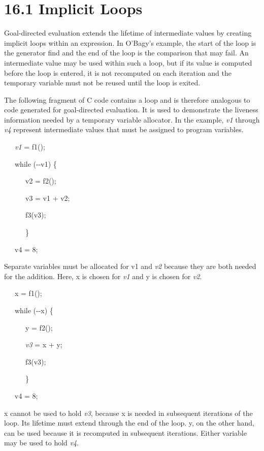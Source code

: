 \section[16.1 Implicit Loops]{16.1 Implicit Loops}

Goal-directed evaluation extends the lifetime of intermediate values
by creating implicit loops within an expression. In O'Bagy's example,
the start of the loop is the generator find and the end of the loop is
the comparison that may fail.  An intermediate value may be used
within such a loop, but if its value is computed before the loop is
entered, it is not recomputed on each iteration and the temporary
variable must not be reused until the loop is exited.

The following fragment of C code contains a loop and is therefore
analogous to code generated for goal-directed evaluation. It is used
to demonstrate the liveness information needed by a temporary variable
allocator. In the example, \textit{v1} through \textit{v4} represent
intermediate values that must be assigned to program variables.

{\ttfamily\mdseries
\ \ \ \textit{v1} = f1();}

{\ttfamily\mdseries
\ \ \ while (-{}-v1) \{}

{\ttfamily\mdseries
\ \ \ \ \ \ v2 = f2();}

{\ttfamily\mdseries
\ \ \ \ \ \ v3 = v1 + v2;}

{\ttfamily\mdseries
\ \ \ \ \ \ f3(v3);}

{\ttfamily\mdseries
\ \ \ \ \ \ \}}

{\ttfamily\mdseries
\ \ \ v4 = 8;}

Separate variables must be allocated for v1 and \textit{v2} because
they are both needed for the addition. Here, x is chosen for
\textit{v1} and y is chosen for \textit{v2}.

{\ttfamily\mdseries
\ \ \ x = f1();}

{\ttfamily\mdseries
\ \ \ while (-{}-x) \{}

{\ttfamily\mdseries
\ \ \ \ \ \ y = f2();}

{\ttfamily\mdseries
\ \ \ \ \ \ \textit{v3} = x + y;}

{\ttfamily\mdseries
\ \ \ \ \ \ f3(v3);}

{\ttfamily\mdseries
\ \ \ \ \ \ \}}

{\ttfamily\mdseries
\ \ \ v4 = 8;}


x cannot be used to hold \textit{v3}, because x is needed in
subsequent iterations of the loop. Its lifetime must extend through
the end of the loop. y, on the other hand, can be used because it is
recomputed in subsequent iterations.  Either variable may be used to
hold \textit{v4}.

